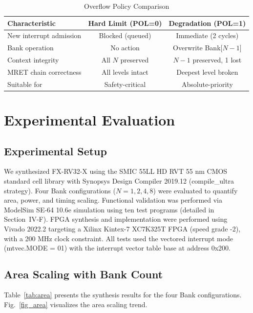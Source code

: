 \documentclass[letterpaper,journal]{IEEEtran}
\begin{document}
\begin{table}[!t]
\caption{Overflow Policy Comparison}
\label{tab:overflow}
\centering
\footnotesize
\setlength{\tabcolsep}{3pt}
\begin{tabular}{@{}lcc@{}}
\toprule
\textbf{Characteristic} & \textbf{Hard Limit (POL=0)} & \textbf{Degradation (POL=1)} \\
\midrule
New interrupt admission  & Blocked (queued)  & Immediate (2 cycles) \\
Bank operation           & No action         & Overwrite Bank[$N-1$] \\
Context integrity        & All $N$ preserved & $N-1$ preserved, 1 lost \\
MRET chain correctness   & All levels intact & Deepest level broken \\
Suitable for             & Safety-critical   & Absolute-priority \\
\bottomrule
\end{tabular}
\end{table}

\section{Experimental Evaluation}

\subsection{Experimental Setup}

We synthesized FX-RV32-X using the SMIC 55LL HD RVT 55 nm CMOS standard cell library with Synopsys Design Compiler 2019.12 (compile\_ultra strategy).
Four Bank configurations ($N = 1, 2, 4, 8$) were evaluated to quantify area, power, and timing scaling.
Functional validation was performed via ModelSim SE-64 10.6e simulation using ten test programs (detailed in Section~IV-F).
FPGA synthesis and implementation were performed using Vivado 2022.2 targeting a Xilinx Kintex-7 XC7K325T FPGA (speed grade -2), with a 200 MHz clock constraint.
All tests used the vectored interrupt mode (mtvec.MODE = 01) with the interrupt vector table base at address 0x200.

\subsection{Area Scaling with Bank Count}

Table~\ref{tab:area} presents the synthesis results for the four Bank configurations.
Fig.~\ref{fig_area} visualizes the area scaling trend.
\end{document}
